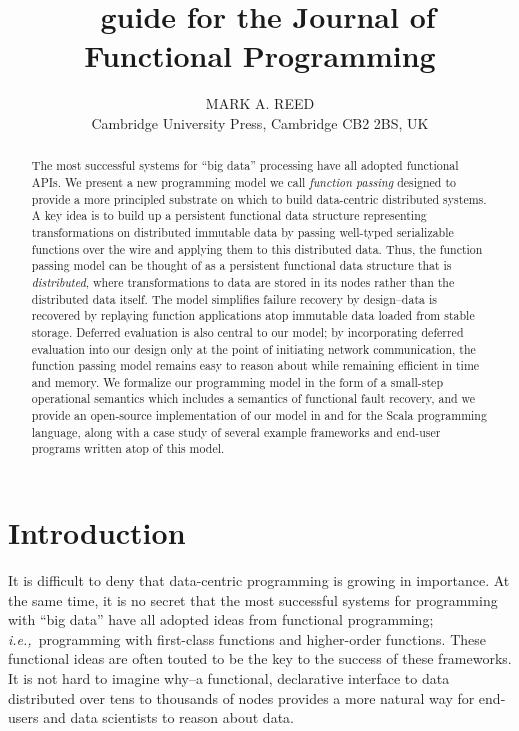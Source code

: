 \documentclass{jfp1}
\title[Journal of Functional Programming]
      {\LaTeXe\ guide for the Journal of Functional Programming}
\author[M. A. Reed]
        {MARK A. REED\\
         Cambridge University Press, Cambridge CB2 2BS, UK\\
         \email{texline@cambridge.org}}
\newcommand{\ie}{{\em i.e.,~}}
\begin{document}
\setmainfont[Mapping=tex-text]{Times New Roman}
\setmonofont[Scale=0.8,BoldFont={Consolas Bold}]{Consolas}

\label{firstpage}

\maketitle

\begin{abstract}
  The most successful systems for ``big data'' processing have all adopted
  functional APIs. We present a new programming model we call {\em function
  passing} designed to provide a more principled substrate on which to build
  data-centric distributed systems. A key idea is to build up a persistent
  functional data structure representing transformations on distributed
  immutable data by passing well-typed serializable functions over the wire and
  applying them to this distributed data. Thus, the function passing model can
  be thought of as a persistent functional data structure that is {\em
  distributed}, where transformations to data are stored in its nodes rather
  than the distributed data itself. The model simplifies failure recovery by
  design--data is recovered by replaying function applications atop immutable
  data loaded from stable storage. Deferred evaluation is also central to our
  model; by incorporating deferred evaluation into our design only at the point
  of initiating network communication, the function passing model remains easy
  to reason about while remaining efficient in time and memory. We formalize our
  programming model in the form of a small-step operational semantics which
  includes a semantics of functional fault recovery, and we provide an
  open-source implementation of our model in and for the Scala programming
  language, along with a case study of several example frameworks and end-user
  programs written atop of this model.
\end{abstract}

\tableofcontents

\section{Introduction}

It is difficult to deny that data-centric programming is growing in importance.
At the same time, it is no secret that the most successful systems for
programming with ``big data'' have all adopted ideas from functional
programming; \ie programming with first-class functions and higher-order
functions. These functional ideas are often touted to be the key to the success
of these frameworks. It is not hard to imagine why--a functional, declarative
interface to data distributed over tens to thousands of nodes provides a more
natural way for end-users and data scientists to reason about data.
\end{document}
